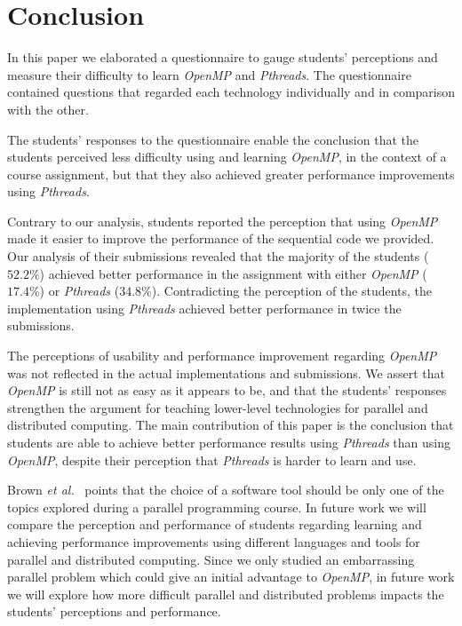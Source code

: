 \section{Conclusion}
\label{sec:conclusion}

In this paper we elaborated a questionnaire to gauge students' perceptions and
measure their difficulty to learn \textit{OpenMP} and \textit{Pthreads}.  The
questionnaire contained questions that regarded each technology individually
and in comparison with the other.

The students' responses to the questionnaire enable the conclusion that the
students perceived less difficulty using and learning \textit{OpenMP}, in the
context of a course assignment, but that they also achieved greater performance
improvements using \textit{Pthreads}.

Contrary to our analysis, students reported the perception that using
\textit{OpenMP} made it easier to improve the performance of the sequential
code we provided.  Our analysis of their submissions revealed that the majority
of the students ($52.2\%$) achieved better performance in the assignment with
either \textit{OpenMP} ($17.4\%$) or \textit{Pthreads} ($34.8\%$).
Contradicting the perception of the students, the implementation using
\textit{Pthreads} achieved better performance in twice the submissions.

The perceptions of usability and performance improvement regarding
\textit{OpenMP} was not reflected in the actual implementations and
submissions.  We assert that \textit{OpenMP} is still not as easy as it appears
to be, and that the students' responses strengthen the argument for teaching
lower-level technologies for parallel and distributed computing.
The main contribution of this paper is the conclusion that students
are able to achieve better performance results using \textit{Pthreads}
than using \textit{OpenMP}, despite their perception that \textit{Pthreads}
is harder to learn and use.

Brown \textit{et al.}~\cite{Brown:2010:SPC:1971681.1971689} points that the
choice of a software tool should be only one of the topics explored during a
parallel programming course.  In future work we will compare the perception and
performance of students regarding learning and achieving performance
improvements using different languages and tools for parallel and distributed
computing.  Since we only studied an embarrassing parallel problem which could
give an initial advantage to \textit{OpenMP}, in future work we will explore
how more difficult parallel and distributed problems impacts the students'
perceptions and performance.
